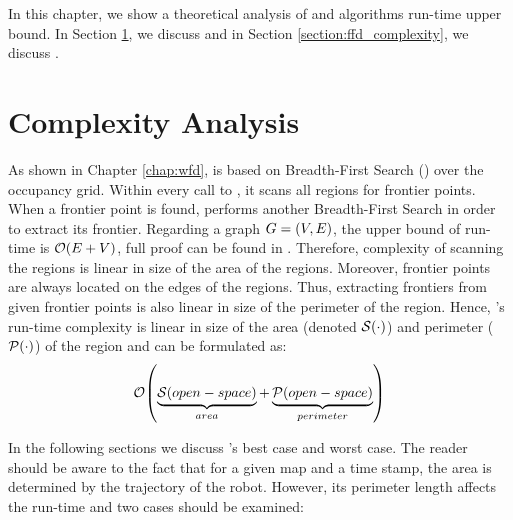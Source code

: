 In this chapter, we show a theoretical analysis of \WFD and \FFD algorithms
run-time upper bound. In Section \ref{section:wfd_complexity}, we discuss \WFD
and in Section \ref{section:ffd_complexity}, we discuss \FFD.



\section{\WFD Complexity Analysis}
\label{section:wfd_complexity}
As shown in Chapter \ref{chap:wfd}, \WFD is based on Breadth-First
Search (\BFS) over the occupancy grid. Within every call to \WFD, it
scans all \openspace regions for frontier points. When a frontier
point is found, \WFD performs another Breadth-First Search in order to
extract its frontier. Regarding a graph $G={\left(V,E\right)}$, the upper bound of \BFS
run-time is $\mathcal{O}{\left(E+V\right)}$, full proof can be found in \cite{Cormen2001}.
Therefore, complexity of scanning the \openspace regions is linear in size of
the area of the \openspace regions. Moreover, frontier points are always located
on the edges of the \openspace regions. Thus, extracting frontiers from given frontier points
is also linear in size of the perimeter of the \openspace region.  
Hence, \WFD's run-time complexity is linear in size of the area (denoted
$\mathcal{S}{\left(\cdot\right)}$) and perimeter ($\mathcal{P}{\left(\cdot\right)}$) of the
\openspace region and can be formulated as:
\begin{equation}\label{eq:wfd_general_complexity}
\mathcal{O}{\left(\underbrace{\mathcal{S}{\left(open-space\right)}}_{area} +
\underbrace{\mathcal{P}{\left(open-space\right)}}_{perimeter}\right)}
\end{equation}

In the following sections we discuss \WFD's best case and worst
case. The reader should be aware to the fact that for a given map and a time
stamp, the \openspace area is determined by the trajectory of the robot.
However, its perimeter length affects the run-time and two cases
should be examined:

